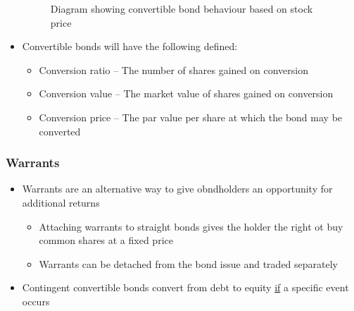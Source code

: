 \documentclass[../notes_compiled.tex]{subfiles}
\begin{document}
\begin{itemize}
\begin{figure}[h!]
  \caption{Diagram showing convertible bond behaviour based on stock price}
\end{figure}
\vspace{-.5cm}
\item[] Convertible bonds will have the following defined:
\begin{itemize}
\item Conversion ratio -- The number of shares gained on conversion
\item Conversion value -- The market value of shares gained on conversion
\item Conversion price -- The par value per share at which the bond may be converted
\end{itemize}
\end{itemize}


\subsubsection{Warrants}
\begin{itemize}
\item Warrants are an alternative way to give obndholders an opportunity for additional returns
\begin{itemize}
\item Attaching warrants to straight bonds gives the holder the right ot buy common shares at a fixed price
\item Warrants can be detached from the bond issue and traded separately
\end{itemize}
\item Contingent convertible bonds convert from debt to equity \underline{if} a specific event occurs
\end{itemize}
\end{document}

